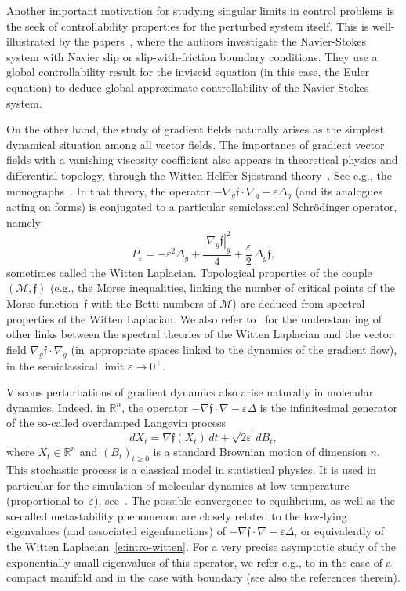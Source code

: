 \documentclass[11pt]{article}
\newcommand{\eg}{e.g.,\xspace}
\numberwithin{equation}{section}
\theoremstyle{definition}
\newcommand{\M}{\ensuremath{\mathcal M}}
\newcommand{\mb}[1]{\ensuremath{\mathbb{#1}}}
\newcommand{\R}{{\mb{R}}}
\newcommand{\f}{\ensuremath{\mathfrak{f}}}
\let\eps\varepsilon
\begin{document}
Another important motivation for studying singular limits in control problems is the seek of controllability properties for the perturbed system itself. This is well-illustrated by the papers~\cite{Cor:96,CF:96,ChaNavier:09,CMS:19}, where the authors investigate the Navier-Stokes system with Navier slip or slip-with-friction boundary conditions. They use a global controllability result for the inviscid equation (in this case, the Euler equation) to deduce global approximate controllability of the Navier-Stokes system.

On the other hand, the study of gradient fields naturally arises as the simplest dynamical situation among all vector fields.
The importance of gradient vector fields with a vanishing viscosity coefficient also appears in theoretical physics and differential topology, through the Witten-Helffer-Sjöstrand theory~\cite{Witten:82,HS:85}. See \eg the monographs~\cite{Helffer:booksemiclassic,CFKS}.
In that theory, the operator $- \nabla_g \f \cdot \nabla_g - \eps \Delta_g$ (and its analogues acting on forms) is conjugated to a particular semiclassical Schrödinger operator, namely
\begin{equation}
\label{e:intro-witten}
P_\eps = -\eps^2 \Delta_g + \frac{|\nabla_g \f|_g^2}{4} + \frac{\eps}{2}\, \Delta_g \f,
\end{equation}
sometimes called the Witten Laplacian.
Topological properties of the couple $(\M,\f)$ (\eg the Morse inequalities, linking the number of critical points of the Morse function~$\f$ with the Betti numbers of $\M$) are deduced from spectral properties of the Witten Laplacian.
We also refer to~\cite{DR:20} for the understanding of other links between the spectral theories of the Witten Laplacian and the vector field $\nabla_g \f \cdot \nabla_g$ (in~appropriate spaces linked to the dynamics of the gradient flow), in the semiclassical limit $\eps\to 0^+$.

Viscous perturbations of gradient dynamics also arise naturally in molecular dynamics.
Indeed, in $\R^n$, the operator $- \nabla \f \cdot \nabla - \eps \Delta$ is the infinitesimal generator of the so-called overdamped Langevin process
\[
dX_t = \nabla \f(X_t)\, dt + \sqrt{2\eps}\, dB_t,
\]
where $X_t\in \R^n$ and $(B_t)_{t\geq0}$ is a standard Brownian motion of dimension $n$. This stochastic process is a classical model in statistical physics. It is used in particular for the simulation of molecular dynamics at low temperature (proportional to~$\eps$), see~\cite{Chan:43,SM:79}. The possible convergence to equilibrium, as well as the so-called metastability phenomenon are closely related to the low-lying eigenvalues (and associated eigenfunctions) of $- \nabla \f \cdot \nabla - \eps \Delta$, or equivalently of the Witten Laplacian~\eqref{e:intro-witten}.
For a very precise asymptotic study of the exponentially small eigenvalues of this operator, we refer \eg to \cite{HKN:04,Michel:19} in the case of a compact manifold and \cite{HN:06,LePeutrec:10,DLLN:19} in the case with boundary (see also the references therein).
\end{document}
